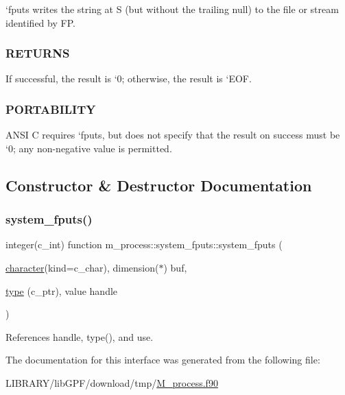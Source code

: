 `fputs\textquotesingle{} writes the string at S (but without the trailing null) to the file or stream identified by FP. \subsubsection*{R\+E\+T\+U\+R\+NS}

If successful, the result is `0\textquotesingle{}; otherwise, the result is `\+E\+OF\textquotesingle{}. \subsubsection*{P\+O\+R\+T\+A\+B\+I\+L\+I\+TY}

A\+N\+SI C requires `fputs\textquotesingle{}, but does not specify that the result on success must be `0\textquotesingle{}; any non-\/negative value is permitted. 

\subsection{Constructor \& Destructor Documentation}
\mbox{\label{interfacem__process_1_1system__fputs_a0a084cac4baf5058a79af7f6490c3a89}} 
\subsubsection{\texorpdfstring{system\+\_\+fputs()}{system\_fputs()}}
{\footnotesize\ttfamily integer(c\+\_\+int) function m\+\_\+process\+::system\+\_\+fputs\+::system\+\_\+fputs (\begin{DoxyParamCaption}\item[{\hyperlink{option__stopwatch_83_8txt_abd4b21fbbd175834027b5224bfe97e66}{character}(kind=c\+\_\+char), dimension($\ast$)}]{buf,  }\item[{\hyperlink{stop__watch_83_8txt_a70f0ead91c32e25323c03265aa302c1c}{type} (c\+\_\+ptr), value}]{handle }\end{DoxyParamCaption})\hspace{0.3cm}{\ttfamily [private]}}



References handle, type(), and use.



The documentation for this interface was generated from the following file\+:\begin{DoxyCompactItemize}
\item 
L\+I\+B\+R\+A\+R\+Y/lib\+G\+P\+F/download/tmp/\hyperlink{M__process_8f90}{M\+\_\+process.\+f90}\end{DoxyCompactItemize}
